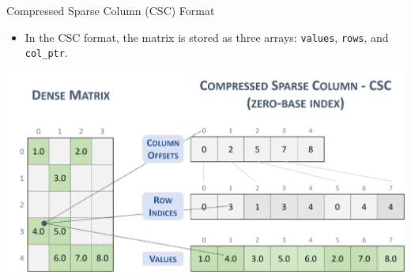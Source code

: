 \documentclass{beamer}
\begin{document}
\begin{frame}{Compressed Sparse Column (CSC) Format}
    \begin{itemize}
        \item In the CSC format, the matrix is stored as three arrays: \texttt{values}, \texttt{rows}, and \texttt{col\_ptr}.
       
    \end{itemize}
    \centerline{\includegraphics[width=\textwidth]{csc.png}}
\end{frame}
\end{document}
